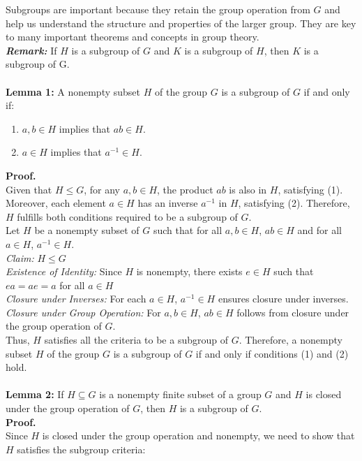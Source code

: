 Subgroups are important because they retain the group operation from \(G\) and help us understand the structure and properties of the larger group.
They are key to many important theorems and concepts in group theory.\\
\textbf{\textit{Remark:}}
{If \(H\) is a subgroup of \(G\) and \(K\) is a subgroup of \(H\), then \(K\) is a subgroup of G.}\\
\\
\textbf{Lemma 1:} A nonempty subset \(H\) of the group \(G\) is a subgroup of \(G\) if and only if:
\begin{enumerate}
    \item \(a, b \in H\) implies that \(ab \in H\).
    \item \(a \in H\) implies that \(a^{-1} \in H\).
\end{enumerate}
\textbf{Proof.}\\
Given that \(H \leq G\), for any \(a, b \in H\), the product \(ab\) is also in \(H\), satisfying (1). Moreover, each element \(a \in H\) has an inverse \(a^{-1}\) in \(H\), satisfying (2). Therefore, \(H\) fulfills both conditions required to be a subgroup of \(G\).\\
Let \(H\) be a nonempty subset of \(G\) such that for all \(a, b \in H\), \(ab \in H\) and for all \(a \in H\), \(a^{-1} \in H\). \\
\textit{Claim:} \(H \leq G\)\\
\textit{Existence of Identity:} Since \(H\) is nonempty, there exists \(e \in H\) such that \(ea = ae = a\) for all \(a \in H\)\\
\textit{Closure under Inverses:} For each \(a \in H\), \(a^{-1} \in H\) ensures closure under inverses.
\\
\textit{Closure under Group Operation:} For \(a, b \in H\), \(ab \in H\) follows from closure under the group operation of \(G\).\\
Thus, \(H\) satisfies all the criteria to be a subgroup of \(G\).
Therefore, a nonempty subset \(H\) of the group \(G\) is a subgroup of \(G\) if and only if conditions (1) and (2) hold.\\
\\
\textbf{Lemma 2:} If \( H \subseteq G \) is a nonempty finite subset of a group \( G \) and \( H \) is closed under the group operation of \( G \), then \( H \) is a subgroup of \( G \).\\
\textbf{Proof.}\\
Since \( H \) is closed under the group operation and nonempty, we need to show that \( H \) satisfies the subgroup criteria:\\
